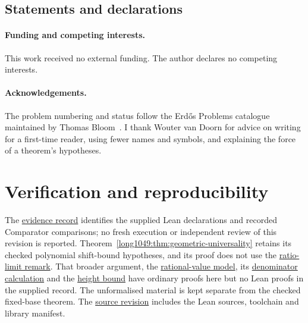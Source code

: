 \documentclass[11pt]{article}
\begin{document}
\subsection*{Statements and declarations}

\paragraph{Funding and competing interests.} This work received no external
funding.  The author declares no competing interests.

\paragraph{Acknowledgements.} The problem numbering and status follow the
Erd\H{o}s Problems catalogue maintained by Thomas Bloom~\cite{erdosproblems}.
I thank Wouter van Doorn for advice on writing for a first-time reader,
using fewer names and symbols, and explaining the force of a theorem's
hypotheses.

\appendix
\section{Verification and reproducibility}\label{long1049:app:index}


The \href{\evidencerecordurl}{evidence record} identifies the supplied
Lean declarations and recorded Comparator comparisons;
no fresh execution or independent review of this revision is
reported. Theorem~\ref{long1049:thm:geometric-universality}
retains its checked polynomial shift-bound hypotheses, and its
proof does not use the \hyperref[long1049:thm:geometric-ratio]{ratio-limit remark}.
That broader argument, the
\hyperref[long1049:thm:calibrated-model]{rational-value model}, its
\hyperref[long1049:thm:calibrated-denominators]{denominator calculation}
and the \hyperref[long1049:prop:calibrated-height]{height bound}
have ordinary proofs here but no Lean proofs in the supplied record. The unformalised material
is kept separate from the checked fixed-base theorem.
The \href{\sourceurl}{source revision} includes the Lean sources,
toolchain and library manifest.
\evidenceparagraph{\evidencerecordurl}
\end{document}
